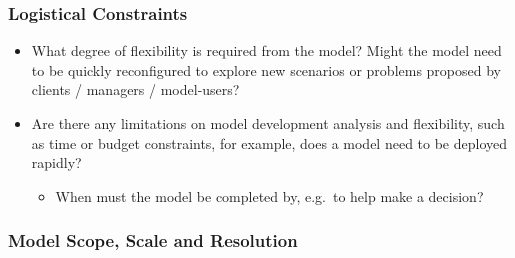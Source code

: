 \documentclass[
]{article}
\providecommand{\tightlist}{%
  \setlength{\itemsep}{0pt}\setlength{\parskip}{0pt}}
\begin{document}
\subsubsection{Logistical Constraints}\label{logistical-constraints}

\begin{tcolorbox}[enhanced jigsaw, opacitybacktitle=0.6, bottomrule=.15mm, leftrule=.75mm, rightrule=.15mm, colbacktitle=quarto-callout-caution-color!10!white, toprule=.15mm, titlerule=0mm, left=2mm, colframe=quarto-callout-caution-color-frame, breakable, title=\textcolor{quarto-callout-caution-color}{\faFire}\hspace{0.5em}{Preregistration Item}, opacityback=0, coltitle=black, bottomtitle=1mm, colback=white, toptitle=1mm, arc=.35mm]

\begin{itemize}
\tightlist
\item[$\square$]
  What degree of flexibility is required from the model? Might the model
  need to be quickly reconfigured to explore new scenarios or problems
  proposed by clients / managers / model-users?
\item[$\square$]
  Are there any limitations on model development analysis and
  flexibility, such as time or budget constraints, for example, does a
  model need to be deployed rapidly?

  \begin{itemize}
  \tightlist
  \item[$\square$]
    When must the model be completed by, e.g.~to help make a decision?
  \end{itemize}
\end{itemize}

\end{tcolorbox}

\subsubsection{Model Scope, Scale and
Resolution}\label{model-scope-scale-and-resolution}
\end{document}
